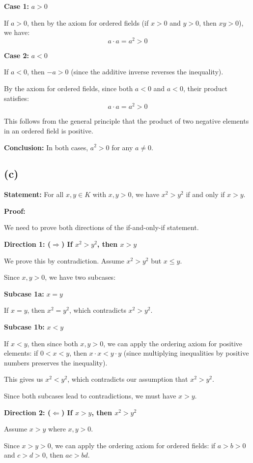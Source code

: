 \documentclass[12pt,a4paper]{article}
\theoremstyle{definition}
\theoremstyle{remark}
\begin{document}
\textbf{Case 1:} $a > 0$

If $a > 0$, then by the axiom for ordered fields (if $x > 0$ and $y > 0$, then $xy > 0$), we have:
$$a \cdot a = a^2 > 0$$

\textbf{Case 2:} $a < 0$

If $a < 0$, then $-a > 0$ (since the additive inverse reverses the inequality).

By the axiom for ordered fields, since both $a < 0$ and $a < 0$, their product satisfies:
$$a \cdot a = a^2 > 0$$

This follows from the general principle that the product of two negative elements in an ordered field is positive.

\textbf{Conclusion:} In both cases, $a^2 > 0$ for any $a \neq 0$.


\subsection*{(c)}

\textbf{Statement:} For all $x, y \in K$ with $x, y > 0$, we have $x^2 > y^2$ if and only if $x > y$.

\textbf{Proof:}

We need to prove both directions of the if-and-only-if statement.

\textbf{Direction 1: ($\Rightarrow$) If $x^2 > y^2$, then $x > y$}

We prove this by contradiction. Assume $x^2 > y^2$ but $x \leq y$.

Since $x, y > 0$, we have two subcases:

\textbf{Subcase 1a:} $x = y$

If $x = y$, then $x^2 = y^2$, which contradicts $x^2 > y^2$.

\textbf{Subcase 1b:} $x < y$

If $x < y$, then since both $x, y > 0$, we can apply the ordering axiom for positive elements: if $0 < x < y$, then $x \cdot x < y \cdot y$ (since multiplying inequalities by positive numbers preserves the inequality).

This gives us $x^2 < y^2$, which contradicts our assumption that $x^2 > y^2$.

Since both subcases lead to contradictions, we must have $x > y$.

\textbf{Direction 2: ($\Leftarrow$) If $x > y$, then $x^2 > y^2$}

Assume $x > y$ where $x, y > 0$.

Since $x > y > 0$, we can apply the ordering axiom for ordered fields: if $a > b > 0$ and $c > d > 0$, then $ac > bd$.
\end{document}
